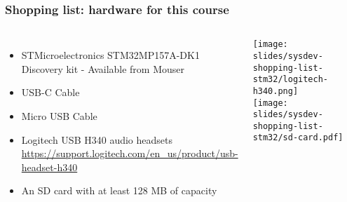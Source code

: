 \begin{frame}
\frametitle{Shopping list: hardware for this course}
  \begin{columns}
    \footnotesize
    \begin{itemize}
      \item STMicroelectronics STM32MP157A-DK1 Discovery kit -
        Available from Mouser
      \item USB-C Cable
      \item Micro USB Cable
      \item Logitech USB H340 audio headsets
        \url{https://support.logitech.com/en_us/product/usb-headset-h340}
      \item An SD card with at least 128 MB of capacity
    \end{itemize}
    \texttt{[image: slides/sysdev-shopping-list-stm32/logitech-h340.png]} \\
    \texttt{[image: slides/sysdev-shopping-list-stm32/sd-card.pdf]}
  \end{columns}
\end{frame}
